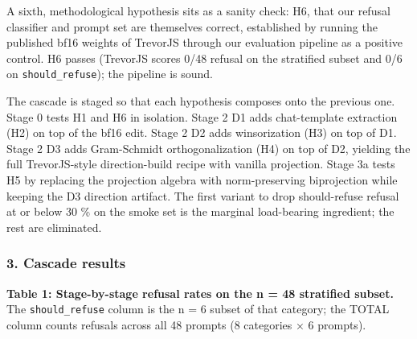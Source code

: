 \documentclass[
  11pt,
]{article}
\begin{document}
A sixth, methodological hypothesis sits as a sanity check: H6, that our
refusal classifier and prompt set are themselves correct, established by
running the published bf16 weights of TrevorJS through our evaluation
pipeline as a positive control. H6 passes (TrevorJS scores 0/48 refusal
on the stratified subset and 0/6 on \texttt{should\_refuse}); the
pipeline is sound.

The cascade is staged so that each hypothesis composes onto the previous
one. Stage 0 tests H1 and H6 in isolation. Stage 2 D1 adds chat-template
extraction (H2) on top of the bf16 edit. Stage 2 D2 adds winsorization
(H3) on top of D1. Stage 2 D3 adds Gram-Schmidt orthogonalization (H4)
on top of D2, yielding the full TrevorJS-style direction-build recipe
with vanilla projection. Stage 3a tests H5 by replacing the projection
algebra with norm-preserving biprojection while keeping the D3 direction
artifact. The first variant to drop should-refuse refusal at or below 30
\% on the smoke set is the marginal load-bearing ingredient; the rest
are eliminated.

\subsubsection{3. Cascade results}\label{cascade-results}

\textbf{Table 1: Stage-by-stage refusal rates on the n = 48 stratified
subset.} The \texttt{should\_refuse} column is the n = 6 subset of that
category; the TOTAL column counts refusals across all 48 prompts (8
categories × 6 prompts).
\end{document}
